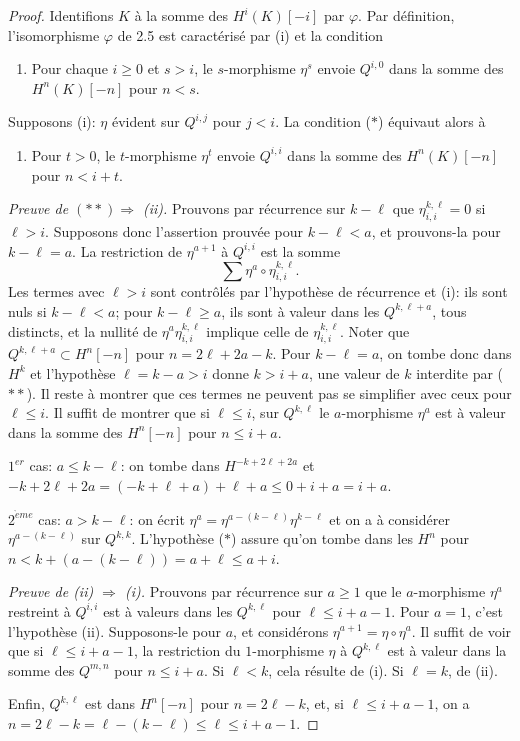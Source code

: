 \documentclass[11pt,a4paper]{article}
\theoremstyle{plain}
\theoremstyle{definition}
\begin{document}
\begin{proof}
Identifions $K$ \`a la somme des $H^i(K)[-i]$ par $\varphi$. Par d\'efinition, l'isomorphisme $\varphi$ de 2.5 est caract\'eris\'e par (i) et la condition
\begin{enumerate}[label=($*$)]
\item Pour chaque $i \geqslant 0$ et $s > i$, le $s$-morphisme $\eta^s$ envoie $Q^{i,0}$ dans la somme des $H^n(K)[-n]$ pour $n < s$.
\end{enumerate}
Supposons (i): $\eta$ \'evident sur $Q^{i,j}$ pour $j < i$. La condition ($*$) \'equivaut alors \`a
\begin{enumerate}[label=($**$)]
\item Pour $t > 0$, le $t$-morphisme $\eta^t$ envoie $Q^{i,i}$ dans la somme des $H^n(K)[-n]$ pour $n < i+t$.
\end{enumerate}

\emph{Preuve de $(**) \Rightarrow$ (ii).} Prouvons par r\'ecurrence sur $k-\ell$ que $\eta^{k,\ell}_{i,i} = 0$ si $\ell > i$. Supposons donc l'assertion prouv\'ee pour $k-\ell < a$, et prouvons-la pour $k-\ell = a$. La restriction de $\eta^{a+1}$ \`a $Q^{i,i}$ est la somme
\[
\sum \eta^a \circ \eta^{k,\ell}_{i,i}.
\]
Les termes avec $\ell > i$ sont contr\^ol\'es par l'hypoth\`ese de r\'ecurrence et (i): ils sont nuls si $k-\ell < a$; pour $k-\ell \geqslant a$, ils sont \`a valeur dans les $Q^{k,\ell+a}$, tous distincts, et la nullit\'e de $\eta^a \eta^{k,\ell}_{i,i}$ implique celle de $\eta^{k,\ell}_{i,i}$. Noter que $Q^{k,\ell+a} \subset H^n[-n]$ pour $n = 2\ell+2a-k$. Pour $k-\ell = a$, on tombe donc dans $H^k$ et l'hypoth\`ese $\ell = k-a > i$ donne $k > i+a$, une valeur de $k$ interdite par ($**$). Il reste \`a montrer que ces termes ne peuvent pas se simplifier avec ceux pour $\ell \leqslant i$. Il suffit de montrer que si $\ell \leqslant i$, sur $Q^{k,\ell}$ le $a$-morphisme $\eta^a$ est \`a valeur dans la somme des $H^n[-n]$ pour $n \leqslant i+a$.

$1^{er}$ cas: $a \leqslant k-\ell$: on tombe dans $H^{-k+2\ell+2a}$ et $-k+2\ell+2a = (-k+\ell+a) + \ell + a \leqslant 0 + i + a = i+a$.

$2^{\grave{e}me}$ cas: $a > k-\ell$: on \'ecrit $\eta^a = \eta^{a-(k-\ell)} \eta^{k-\ell}$ et on a \`a consid\'erer $\eta^{a-(k-\ell)}$ sur $Q^{k,k}$. L'hypoth\`ese ($*$) assure qu'on tombe dans les $H^n$ pour $n < k+(a-(k-\ell)) = a+\ell \leqslant a+i$.

\emph{Preuve de (ii) $\Rightarrow$ (i).} Prouvons par r\'ecurrence sur $a \geqslant 1$ que le $a$-morphisme $\eta^a$ restreint \`a $Q^{i,i}$ est \`a valeurs dans les $Q^{k,\ell}$ pour $\ell \leqslant i+a-1$. Pour $a=1$, c'est l'hypoth\`ese (ii). Supposons-le pour $a$, et consid\'erons $\eta^{a+1} = \eta \circ \eta^a$. Il suffit de voir que si $\ell \leqslant i+a-1$, la restriction du $1$-morphisme $\eta$ \`a $Q^{k,\ell}$ est \`a valeur dans la somme des $Q^{m,n}$ pour $n \leqslant i+a$. Si $\ell < k$, cela r\'esulte de (i). Si $\ell = k$, de (ii).

Enfin, $Q^{k,\ell}$ est dans $H^n[-n]$ pour $n = 2\ell-k$, et, si $\ell \leqslant i+a-1$, on a $n = 2\ell-k = \ell-(k-\ell) \leqslant \ell \leqslant i+a-1$.
\end{proof}
\end{document}
